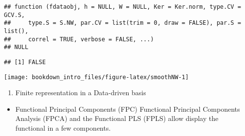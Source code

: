 \documentclass[
]{book}
\newenvironment{Shaded}{\begin{snugshade}}{\end{snugshade}}
\newcommand{\AttributeTok}[1]{\textcolor[rgb]{0.77,0.63,0.00}{#1}}
\newcommand{\CommentTok}[1]{\textcolor[rgb]{0.56,0.35,0.01}{\textit{#1}}}
\newcommand{\DecValTok}[1]{\textcolor[rgb]{0.00,0.00,0.81}{#1}}
\newcommand{\FunctionTok}[1]{\textcolor[rgb]{0.00,0.00,0.00}{#1}}
\newcommand{\NormalTok}[1]{#1}
\newcommand{\OtherTok}[1]{\textcolor[rgb]{0.56,0.35,0.01}{#1}}
\newcommand{\SpecialCharTok}[1]{\textcolor[rgb]{0.00,0.00,0.00}{#1}}
\newcommand{\StringTok}[1]{\textcolor[rgb]{0.31,0.60,0.02}{#1}}
\providecommand{\tightlist}{%
  \setlength{\itemsep}{0pt}\setlength{\parskip}{0pt}}
\begin{document}
\begin{verbatim}
## function (fdataobj, h = NULL, W = NULL, Ker = Ker.norm, type.CV = GCV.S, 
##     type.S = S.NW, par.CV = list(trim = 0, draw = FALSE), par.S = list(), 
##     correl = TRUE, verbose = FALSE, ...) 
## NULL
\end{verbatim}

\begin{Shaded}
\end{Shaded}

\begin{verbatim}
## [1] FALSE
\end{verbatim}

\begin{Shaded}
\end{Shaded}

\begin{center}\texttt{[image: bookdown\_intro\_files/figure-latex/smoothNW-1]} \end{center}

\begin{enumerate}
\def\labelenumi{\arabic{enumi}.}
\setcounter{enumi}{2}
\tightlist
\item
  Finite representation in a Data-driven basis \citep{Cardot_1999}
\end{enumerate}

\begin{itemize}
\tightlist
\item
  Functional Principal Components (FPC)
  Functional Principal Components Analysis (FPCA) and the Functional PLS (FPLS) allow display the functional in a few components.
\end{itemize}
\end{document}
